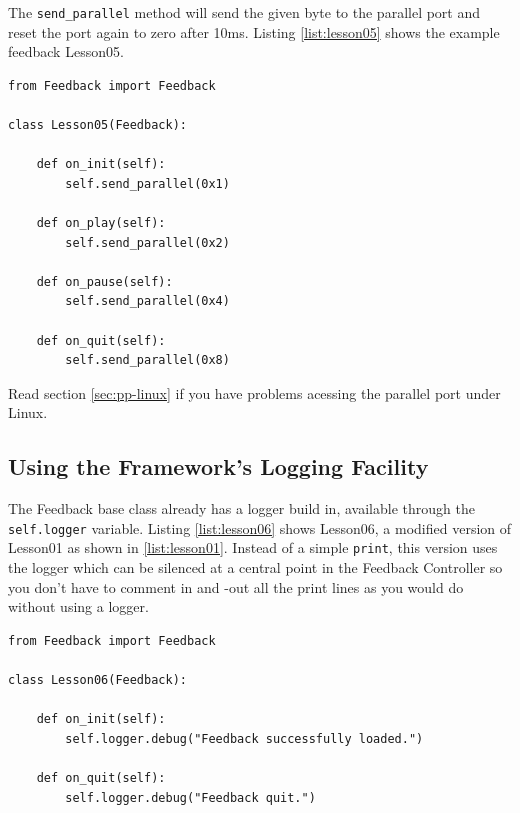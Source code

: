 The \lstinline+send_parallel+ method will send the given byte to the parallel port and reset the port again to zero after 10ms. Listing \ref{list:lesson05} shows the example feedback Lesson05.

\begin{lstlisting}[caption=Sending markers., label={list:lesson05}]
from Feedback import Feedback

class Lesson05(Feedback):
    
    def on_init(self):
        self.send_parallel(0x1)
    
    def on_play(self):
        self.send_parallel(0x2)
    
    def on_pause(self):
        self.send_parallel(0x4)
    
    def on_quit(self):
        self.send_parallel(0x8)
\end{lstlisting}

Read section \ref{sec:pp-linux} if you have problems acessing the parallel port under Linux.

\subsection{Using the Framework's Logging Facility}
The Feedback base class already has a logger build in, available through the \lstinline+self.logger+ variable. Listing \ref{list:lesson06} shows Lesson06, a modified version of Lesson01 as shown in \ref{list:lesson01}. Instead of a simple \lstinline+print+, this version uses the logger which can be silenced at a central point in the Feedback Controller so you don't have to comment in and -out all the print lines as you would do without using a logger.

\begin{lstlisting}[caption=Using the Feedback's logger., label={list:lesson06}]
from Feedback import Feedback

class Lesson06(Feedback):
    
    def on_init(self):
        self.logger.debug("Feedback successfully loaded.")
    
    def on_quit(self):
        self.logger.debug("Feedback quit.")
\end{lstlisting}

